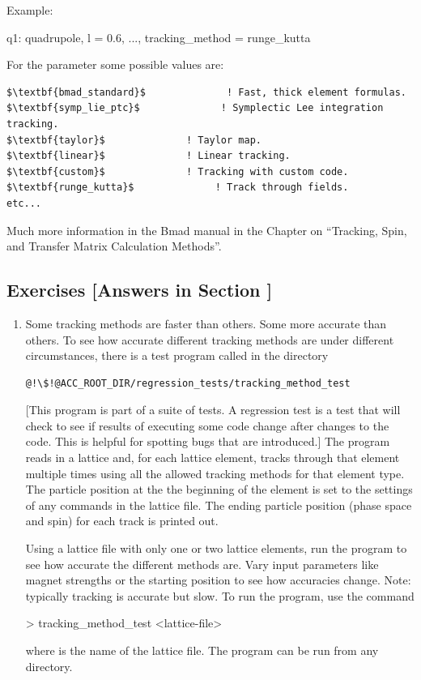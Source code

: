 \documentclass{hitec}     %
\begin{document}
Example:
\begin{code}
q1: quadrupole, l = 0.6, ..., tracking_method = runge_kutta
\end{code}

For the  parameter some possible values are:
\begin{lstlisting}[mathescape]
$\textbf{bmad_standard}$              ! Fast, thick element formulas.
$\textbf{symp_lie_ptc}$              ! Symplectic Lee integration tracking.
$\textbf{taylor}$              ! Taylor map.
$\textbf{linear}$              ! Linear tracking.
$\textbf{custom}$              ! Tracking with custom code.
$\textbf{runge_kutta}$              ! Track through fields.
etc...
\end{lstlisting}

Much more information in the Bmad manual in the Chapter on ``Tracking, Spin, and Transfer Matrix
Calculation Methods''.

\subsection{Exercises [Answers in Section ]}
\label{s:methods.ex}

\begin{enumerate}[label=\thesection.\arabic{enumi}]
\item
Some tracking methods are faster than others. Some more accurate than others. To see how accurate
different tracking methods are under different circumstances, there is a test program called 
 in the directory
\begin{lstlisting}[mathescape]
  @!\$!@ACC_ROOT_DIR/regression_tests/tracking_method_test
\end{lstlisting}
[This program is part of a suite of  tests. A regression test is a test that will
check to see if results of executing some code change after changes to the code. This is helpful for
spotting bugs that are introduced.] The  program reads in a lattice and,
for each lattice element, tracks through that element multiple times using all the allowed tracking
methods for that element type. The particle position at the the beginning of the element is set to
the settings of any  commands in the lattice file. The ending particle position
(phase space and spin) for each track is printed out.

Using a lattice file with only one or two lattice elements, run the 
program to see how accurate the different methods are. Vary input parameters like magnet strengths
or the starting position to see how accuracies change. Note: typically  tracking is
accurate but slow. To run the program, use the command
\begin{code}
  > tracking_method_test <lattice-file>
\end{code}
where  is the name of the lattice file. The program can be run from any directory.

\end{enumerate}
\end{document}
